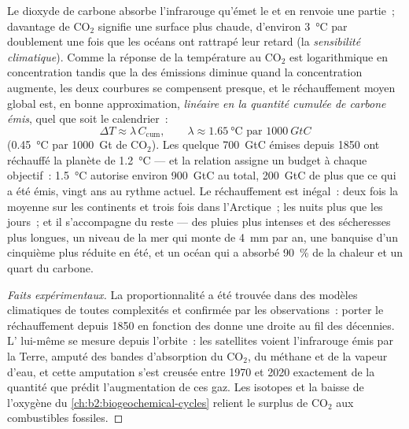 \begin{proposition}\label{prop:b2:global-change:tcre}
Le dioxyde de carbone absorbe l'infrarouge qu'émet le  et en renvoie
une partie~; davantage de \ensuremath{\mathrm{CO_2}} signifie une surface plus chaude,
d'environ \qty{3}{\celsius} par doublement une fois que les océans ont
rattrapé leur retard (la \emph{sensibilité climatique}). Comme la réponse
de la température au \ensuremath{\mathrm{CO_2}} est logarithmique en concentration tandis
que la  des émissions diminue quand la
concentration augmente, les deux courbures se compensent presque, et le
réchauffement moyen global est, en bonne approximation, \emph{linéaire
en la quantité cumulée de carbone émis}, quel que soit le calendrier~:
\[
\Delta T \approx \lambda\,C_{\text{cum}}, \qquad \lambda \approx
\qty{1.65}{\celsius} \text{ par } \qty{1000}{GtC}
\]
(\qty{0.45}{\celsius} par \qty{1000}{Gt} de \ensuremath{\mathrm{CO_2}}). Les quelque
\qty{700}{GtC} émises depuis 1850 ont réchauffé la planète de
\qty{1.2}{\celsius} --- et la relation assigne un budget à chaque
objectif~: \qty{1.5}{\celsius} autorise environ \qty{900}{GtC} au total,
\qty{200}{GtC} de plus que ce qui a été émis, vingt ans au rythme
actuel. Le réchauffement est inégal~: deux fois la moyenne sur les
continents et trois fois dans l'Arctique~; les nuits plus que les jours~;
et il s'accompagne du reste --- des pluies plus intenses et des
sécheresses plus longues, un niveau de la mer qui monte de \qty{4}{mm}
par an, une banquise d'un cinquième plus réduite en été, et un océan qui
a absorbé \qty{90}{\%} de la chaleur et un quart du carbone.
\end{proposition}
\begin{proof}[Faits expérimentaux]
La proportionnalité a été trouvée dans des modèles climatiques de toutes
complexités et confirmée par les observations~: porter le réchauffement
depuis 1850 en fonction des  donne une droite au fil
des décennies. L' lui-même se mesure depuis l'orbite~: les
satellites voient l'infrarouge émis par la Terre, amputé des bandes
d'absorption du \ensuremath{\mathrm{CO_2}}, du méthane et de la vapeur d'eau, et cette
amputation s'est creusée entre 1970 et 2020 exactement de la quantité que
prédit l'augmentation de ces gaz. Les isotopes et la baisse de l'oxygène
du \cref{ch:b2:biogeochemical-cycles} relient le surplus de
\ensuremath{\mathrm{CO_2}} aux combustibles fossiles.
\end{proof}

